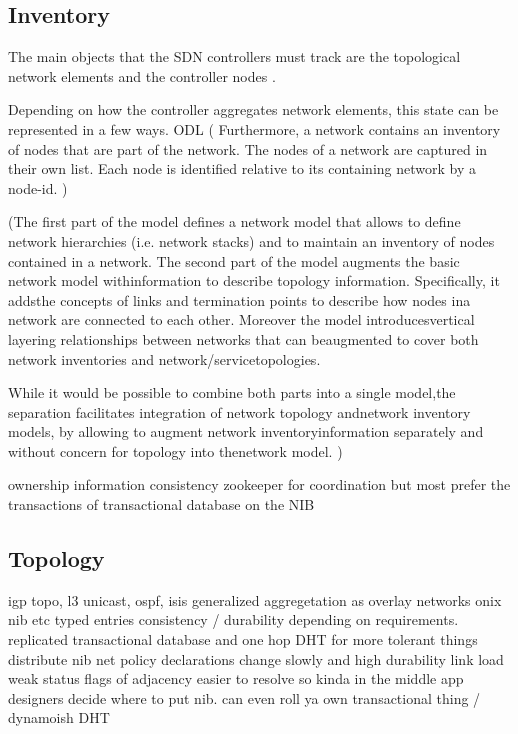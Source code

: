 \documentclass[letterpaper,twocolumn,10pt]{article}
\begin{document}
\subsection*{Inventory}

The main objects that the SDN controllers must track are the topological network elements and the controller nodes \cite{network2015topologies}.

Depending on how the controller aggregates network elements, this state can be represented in a few ways. ODL 
( Furthermore, a network contains an inventory of nodes that are part of the network. The nodes of a network are captured in their own list. Each node is identified relative to its containing network by a node-id.  )

(The first part of the model defines a network model that allows to define network hierarchies (i.e. network stacks) and to maintain an inventory of nodes contained in a network. The second part of the model augments the basic network model withinformation to describe topology information.  Specifically, it addsthe concepts of links and termination points to describe how nodes ina network are connected to each other.  Moreover the model introducesvertical layering relationships between networks that can beaugmented to cover both network inventories and network/servicetopologies.

While it would be possible to combine both parts into a single model,the separation facilitates integration of network topology andnetwork inventory models, by allowing to augment network inventoryinformation separately and without concern for topology into thenetwork model.
)

ownership information
consistency
    zookeeper for coordination
    but most prefer the transactions of transactional database on the NIB

\subsection*{Topology}
igp topo, l3 unicast, ospf, isis
generalized aggregetation as overlay networks
onix nib etc
typed entries
consistency / durability depending on requirements. replicated transactional database and one hop DHT for more tolerant things
distribute nib
    net policy declarations change slowly and high durability
    link load weak
    status flags of adjacency easier to resolve so kinda in the middle
    app designers decide where to put nib. 
        can even roll ya own
    transactional thing / dynamoish DHT 
    
\end{document}
